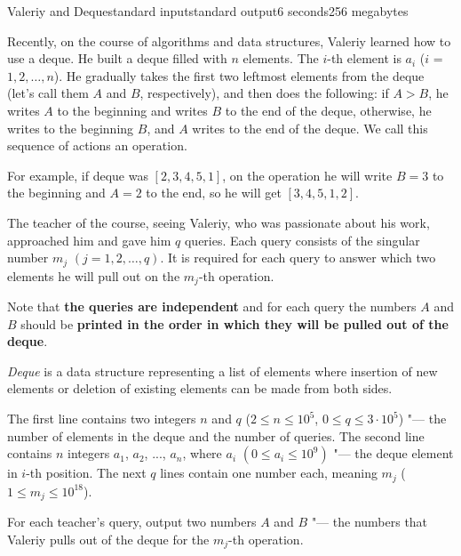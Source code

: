\begin{problem}{Valeriy and Deque}{standard input}{standard output}{6 seconds}{256 megabytes}

Recently, on the course of algorithms and data structures, Valeriy learned how to use a deque. He built a deque filled with $n$ elements. The $i$-th element is $a_i$ ($i$ = $1, 2, \ldots, n$). He gradually takes the first two leftmost elements from the deque (let's call them $A$ and $B$, respectively), and then does the following: if $A > B$, he writes $A$ to the beginning and writes $B$ to the end of the deque, otherwise, he writes to the beginning $B$, and $A$ writes to the end of the deque. We call this sequence of actions an operation.

For example, if deque was $[2, 3, 4, 5, 1]$, on the operation he will write $B=3$ to the beginning and $A=2$ to the end, so he will get $[3, 4, 5, 1, 2]$.

The teacher of the course, seeing Valeriy, who was passionate about his work, approached him and gave him $q$ queries. Each query consists of the singular number $m_j$ $(j = 1, 2, \ldots, q)$. It is required for each query to answer which two elements he will pull out on the $m_j$-th operation.

Note that \textbf{the queries are independent} and for each query the numbers $A$ and $B$ should be \textbf{printed in the order in which they will be pulled out of the deque}.

\textit{Deque} is a data structure representing a list of elements where insertion of new elements or deletion of existing elements can be made from both sides.


\InputFile
The first line contains two integers $n$ and $q$ ($2 \leq n \leq 10^5$, $0 \leq q \leq 3 \cdot 10^5$) "--- the number of elements in the deque and the number of queries.
The second line contains $n$ integers $a_1$, $a_2$, ..., $a_n$, where $a_i$ $(0 \leq a_i \leq 10^9)$ "--- the deque element in $i$-th position.
The next $q$  lines contain one number each, meaning $m_j$ ($1 \leq m_j \leq 10^{18}$).

\OutputFile
For each teacher's query, output two numbers $A$ and $B$ "--- the numbers that Valeriy pulls out of the deque for the $m_j$-th operation.

\Examples

\begin{example}
%
%
\end{example}


\end{problem}
